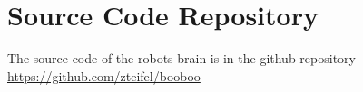 \section{Source Code Repository}
The source code of the robots brain is in the github repository \url{https://github.com/zteifel/booboo}